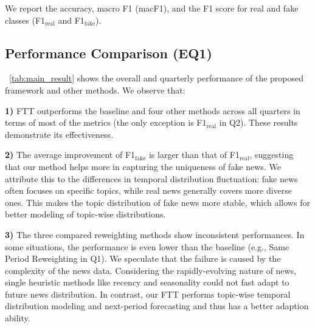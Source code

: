 \documentclass[11pt]{article}
\begin{document}
We report the accuracy, macro F1 (macF1), and the F1 score for real and fake classes (F1$_\mathrm{real}$ and F1$_\mathrm{fake}$).

\subsection{Performance Comparison (EQ1)}
\tablename~\ref{tab:main_result} shows the overall and quarterly performance of the proposed framework and other methods. We observe that:

\textbf{1)} FTT outperforms the baseline and four other methods across all quarters in terms of most of the metrics (the only exception is F1$_\mathrm{real}$ in Q2). These results demonstrate its effectiveness.

\textbf{2)} The average improvement of F1$_\mathrm{fake}$ is larger than that of F1$_\mathrm{real}$, suggesting that our method helps more in capturing the uniqueness of fake news. We attribute this to the differences in temporal distribution fluctuation: fake news often focuses on specific topics, while real news generally covers more diverse ones. This makes the topic distribution of fake news more stable, which allows for better modeling of topic-wise distributions.

\textbf{3)} The three compared reweighting methods show inconsistent performances. In some situations, the performance is even lower than the baseline (e.g., Same Period Reweighting in Q1). We speculate that the failure is caused by the complexity of the news data. Considering the rapidly-evolving nature of news, single heuristic methods like recency and seasonality could not fast adapt to future news distribution. In contrast, our FTT performs topic-wise temporal distribution modeling and next-period forecasting and thus has a better adaption ability.
\end{document}
